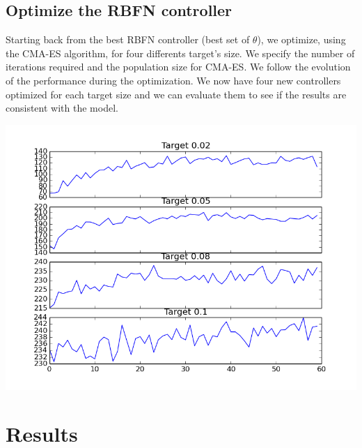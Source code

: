 \documentclass[pdftex,a4paper,12pt]{report}
\begin{document}
\subsection{Optimize the RBFN controller}
Starting back from the best RBFN controller (best set of $\theta$), we optimize, using the CMA-ES algorithm, for four differents target's size.
We specify the number of iterations required and the population size for CMA-ES. We follow the evolution of the performance during the optimization.
We now have four new controllers optimized for each target size and we can evaluate them to see if the results are consistent with the model.
\begin{center}
\includegraphics[scale=0.5]{figures/cmaesProgression6000.png}
\end{center}

\section{Results}
\end{document}
